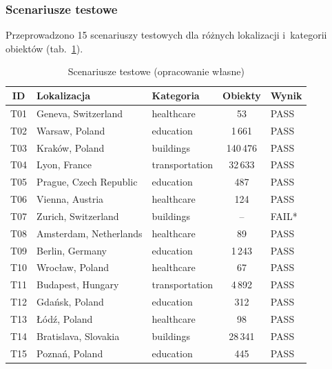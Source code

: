 \subsubsection{Scenariusze testowe}

Przeprowadzono 15 scenariuszy testowych dla różnych lokalizacji i~kategorii obiektów (tab.~\ref{tab:test_scenarios}).

\begin{table}[H]
    \centering
    \caption{Scenariusze testowe (opracowanie własne)}
    \begin{tabular}{|c|l|l|c|l|}
        \hline
        \textbf{ID} & \textbf{Lokalizacja} & \textbf{Kategoria} & \textbf{Obiekty} & \textbf{Wynik} \\
        \hline
        T01 & Geneva, Switzerland & healthcare & 53 & PASS \\
        \hline
        T02 & Warsaw, Poland & education & 1\,661 & PASS \\
        \hline
        T03 & Kraków, Poland & buildings & 140\,476 & PASS \\
        \hline
        T04 & Lyon, France & transportation & 32\,633 & PASS \\
        \hline
        T05 & Prague, Czech Republic & education & 487 & PASS \\
        \hline
        T06 & Vienna, Austria & healthcare & 124 & PASS \\
        \hline
        T07 & Zurich, Switzerland & buildings & -- & FAIL* \\
        \hline
        T08 & Amsterdam, Netherlands & healthcare & 89 & PASS \\
        \hline
        T09 & Berlin, Germany & education & 1\,243 & PASS \\
        \hline
        T10 & Wrocław, Poland & healthcare & 67 & PASS \\
        \hline
        T11 & Budapest, Hungary & transportation & 4\,892 & PASS \\
        \hline
        T12 & Gdańsk, Poland & education & 312 & PASS \\
        \hline
        T13 & Łódź, Poland & healthcare & 98 & PASS \\
        \hline
        T14 & Bratislava, Slovakia & buildings & 28\,341 & PASS \\
        \hline
        T15 & Poznań, Poland & education & 445 & PASS \\
        \hline
    \end{tabular}
    \label{tab:test_scenarios}
\end{table}

